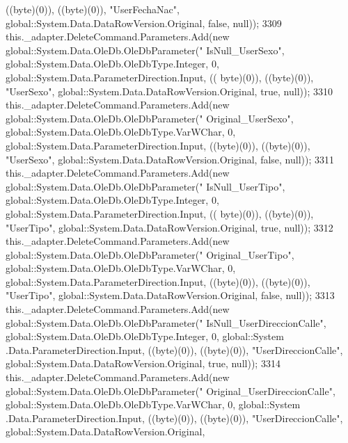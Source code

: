\begin{DoxyCode}
       ((byte)(0)), ((byte)(0)), \textcolor{stringliteral}{"UserFechaNac"}, global::System.Data.DataRowVersion.Original, \textcolor{keyword}{false}, null));
3309             this.\_adapter.DeleteCommand.Parameters.Add(\textcolor{keyword}{new} global::System.Data.OleDb.OleDbParameter(\textcolor{stringliteral}{"
      IsNull\_UserSexo"}, global::System.Data.OleDb.OleDbType.Integer, 0, global::System.Data.ParameterDirection.Input, ((
      byte)(0)), ((byte)(0)), \textcolor{stringliteral}{"UserSexo"}, global::System.Data.DataRowVersion.Original, \textcolor{keyword}{true}, null));
3310             this.\_adapter.DeleteCommand.Parameters.Add(\textcolor{keyword}{new} global::System.Data.OleDb.OleDbParameter(\textcolor{stringliteral}{"
      Original\_UserSexo"}, global::System.Data.OleDb.OleDbType.VarWChar, 0, global::System.Data.ParameterDirection.Input,
       ((byte)(0)), ((byte)(0)), \textcolor{stringliteral}{"UserSexo"}, global::System.Data.DataRowVersion.Original, \textcolor{keyword}{false}, null));
3311             this.\_adapter.DeleteCommand.Parameters.Add(\textcolor{keyword}{new} global::System.Data.OleDb.OleDbParameter(\textcolor{stringliteral}{"
      IsNull\_UserTipo"}, global::System.Data.OleDb.OleDbType.Integer, 0, global::System.Data.ParameterDirection.Input, ((
      byte)(0)), ((byte)(0)), \textcolor{stringliteral}{"UserTipo"}, global::System.Data.DataRowVersion.Original, \textcolor{keyword}{true}, null));
3312             this.\_adapter.DeleteCommand.Parameters.Add(\textcolor{keyword}{new} global::System.Data.OleDb.OleDbParameter(\textcolor{stringliteral}{"
      Original\_UserTipo"}, global::System.Data.OleDb.OleDbType.VarWChar, 0, global::System.Data.ParameterDirection.Input,
       ((byte)(0)), ((byte)(0)), \textcolor{stringliteral}{"UserTipo"}, global::System.Data.DataRowVersion.Original, \textcolor{keyword}{false}, null));
3313             this.\_adapter.DeleteCommand.Parameters.Add(\textcolor{keyword}{new} global::System.Data.OleDb.OleDbParameter(\textcolor{stringliteral}{"
      IsNull\_UserDireccionCalle"}, global::System.Data.OleDb.OleDbType.Integer, 0, global::System
      .Data.ParameterDirection.Input, ((byte)(0)), ((byte)(0)), \textcolor{stringliteral}{"UserDireccionCalle"}, global::System.Data.DataRowVersion.Original, \textcolor{keyword}{true}, 
      null));
3314             this.\_adapter.DeleteCommand.Parameters.Add(\textcolor{keyword}{new} global::System.Data.OleDb.OleDbParameter(\textcolor{stringliteral}{"
      Original\_UserDireccionCalle"}, global::System.Data.OleDb.OleDbType.VarWChar, 0, global::System
      .Data.ParameterDirection.Input, ((byte)(0)), ((byte)(0)), \textcolor{stringliteral}{"UserDireccionCalle"}, global::System.Data.DataRowVersion.Original, \textcolor{keyword}{
}
\end{DoxyCode}
